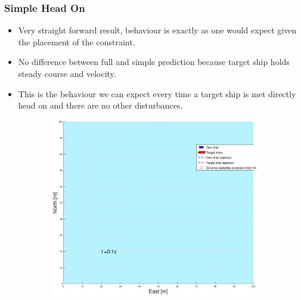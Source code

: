 \subsubsection{Simple Head On}
\begin{itemize}
    \item Very straight forward result, behaviour is exactly as one would expect given the placement of the constraint.
    \item No difference between full and simple prediction because target ship holds steady course and velocity.
    \item This is the behaviour we can expect every time a target ship is met directly head on and there are no other disturbances.
\end{itemize}
\clearpage
\begin{figure}[!b]
    \begin{subfigure}[b]{0.49\textwidth}
        \centering
        \includegraphics[width=\textwidth]{Images/Figures/enkel_HO/_Simple_0fig1_time=0}
    \end{subfigure}
    \hfill
    \begin{subfigure}[b]{0.499\textwidth}
        \centering

\end{subfigure}
\end{figure}
